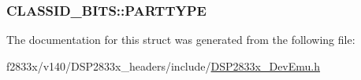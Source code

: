 \subsubsection[{P\+A\+R\+T\+T\+Y\+P\+E}]{ C\+L\+A\+S\+S\+I\+D\+\_\+\+B\+I\+T\+S\+::\+P\+A\+R\+T\+T\+Y\+P\+E}\label{struct_c_l_a_s_s_i_d___b_i_t_s_a247e66d573cba33b18a80365f31f0d33}


The documentation for this struct was generated from the following file\+:\begin{DoxyCompactItemize}
\item 
f2833x/v140/\+D\+S\+P2833x\+\_\+headers/include/\hyperlink{_d_s_p2833x___dev_emu_8h}{D\+S\+P2833x\+\_\+\+Dev\+Emu.\+h}\end{DoxyCompactItemize}
